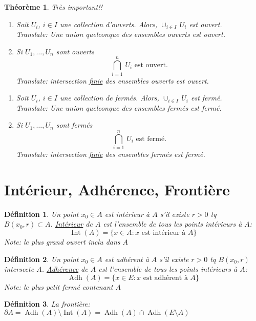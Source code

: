 \documentclass[a4paper]{article}
\newtheorem{theorem}{Théorème}[section]
\newtheorem{definition}{Définition}[section]
\begin{document}
\begin{theorem} Très important!!
    \begin{enumerate}
        \item Soit $U_i$,  $i \in I$ une collection d'ouverts. Alors,  $\cup_{i \in I} \,U_i$ est ouvert.\\
            Translate: Une union quelconque des ensembles ouverts est ouvert.
        \item Si $U_1, \ldots, U_n$ sont ouverts
            \[
                \bigcap\limits_{i=1}^{n} \, U_i \text{ est ouvert.}
            \] 
            Translate: intersection \underline{finie} des ensembles ouverts est ouvert.
    \end{enumerate}
    \begin{enumerate}
        \item Soit $U_i$,  $i \in I$ une collection de fermés. Alors,  $\cup_{i \in I} \,U_i$ est fermé.\\
            Translate: Une union quelconque des ensembles fermés est fermé.
        \item Si $U_1, \ldots, U_n$ sont fermés 
            \[
                \bigcap\limits_{i=1}^{n} \, U_i \text{ est fermé.}
            \] 
            Translate: intersection \underline{finie} des ensembles fermés est fermé.
    \end{enumerate}
\end{theorem}

\section{Intérieur, Adhérence, Frontière}
\begin{definition} 
    Un point $x_0 \in A$ est intérieur à $A$ s'il existe  $r > 0$ tq  $B(x_0, r) \subset A$. \underline{Intérieur} de $A$ est l'ensemble de tous les points intérieurs à  $A$:
     \[
         \operatorname{Int}(A) = \{ x \in A : x \text{ est intérieur à } A \}
    \] 
    Note: le plus grand ouvert inclu dans $A$
\end{definition}
\begin{definition} 
    Un point $x_0 \in A$ est adhérent à $A$ s'il existe  $r > 0$ tq  $B(x_0, r)$ intersecte $A$. \underline{Adhérence} de $A$ est l'ensemble de tous les points intérieurs à  $A$:
     \[
         \operatorname{Adh}(A) = \{ x \in E : x \text{ est adhérent à } A \}
    \] 
    Note: le plus petit fermé contenant $A$
\end{definition}
\begin{definition}
    La frontière: $\partial A = \operatorname{Adh}(A) \setminus \operatorname{Int}(A) = \operatorname{Adh}(A) \cap \operatorname{Adh}(E \setminus A)$
\end{definition}
\end{document}
